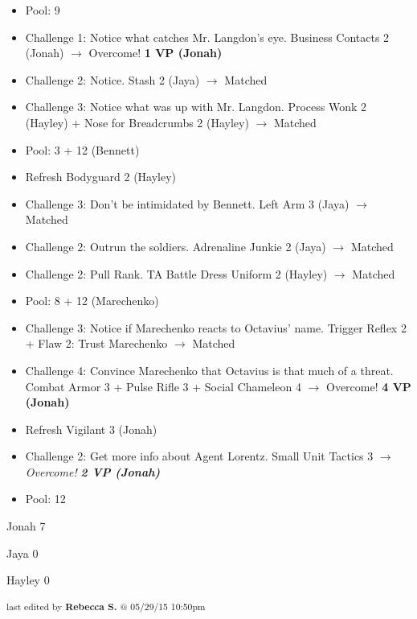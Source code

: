 \begin{itemize}
\item Pool: 9
\item Challenge 1:  Notice what catches Mr. Langdon's eye. Business Contacts 2 (Jonah) $\rightarrow$ Overcome! \textbf{1 VP (Jonah)}
\item Challenge 2:  Notice.  Stash 2 (Jaya) $\rightarrow$ Matched
\item Challenge 3: Notice what was up with Mr. Langdon.  Process Wonk 2 (Hayley) + Nose for Breadcrumbs 2 (Hayley) $\rightarrow$ Matched
\item Pool: 3 + 12 (Bennett)
\item Refresh Bodyguard 2 (Hayley)
\item Challenge 3: Don't be intimidated by Bennett.   Left Arm 3 (Jaya) $\rightarrow$ Matched
\item Challenge 2: Outrun the soldiers.  Adrenaline Junkie 2 (Jaya) $\rightarrow$ Matched
\item Challenge 2: Pull Rank.   TA Battle Dress Uniform 2 (Hayley) $\rightarrow$ Matched
\item Pool: 8 + 12 (Marechenko)
\item Challenge 3: Notice if Marechenko reacts to Octavius' name.  Trigger Reflex 2 +  {\color[RGB]{255,0,0}Flaw 2: Trust Marechenko}  $\rightarrow$ Matched
\item Challenge 4: Convince Marechenko that Octavius is that much of a threat.  Combat Armor 3 + Pulse Rifle 3 + Social Chameleon 4 $\rightarrow$ Overcome! \textbf{4 VP (Jonah)}
\item Refresh Vigilant 3 (Jonah)
\item Challenge 2: Get more info about Agent Lorentz.  Small Unit Tactics 3 \textit{$\rightarrow$ Overcome! }\textit{\textbf{2 VP (Jonah)}}
\item Pool: 12
\end{itemize}





Jonah 7

Jaya 0

Hayley 0





\vspace{\fill}

\begin{flushright}
\textsubscript{last edited by \textbf{Rebecca S.} @ 05/29/15 10:50pm}
\end{flushright}

